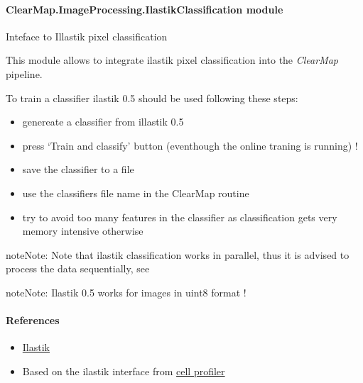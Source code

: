 \documentclass[letterpaper,10pt,english]{sphinxmanual}
\begin{document}
\paragraph{ClearMap.ImageProcessing.IlastikClassification module}
\label{api/ClearMap.ImageProcessing:module-ClearMap.ImageProcessing.IlastikClassification}\label{api/ClearMap.ImageProcessing:clearmap-imageprocessing-ilastikclassification-module}
Inteface to Illastik pixel classification

This module allows to integrate ilastik pixel classification into the \emph{ClearMap}
pipeline.

To train a classifier ilastik 0.5 should be used following these steps:
\begin{itemize}
\item {} 
genereate a classifier from illastik 0.5

\item {} 
press `Train and classify' button (eventhough the online traning is running) !

\item {} 
save the classifier to a file

\item {} 
use the classifiers file name in the ClearMap routine {\hyperref[api/ClearMap.ImageProcessing:ClearMap.ImageProcessing.IlastikClassification.classifyPixel]{\emph{}}}

\item {} 
try to avoid too many features in the classifier
as classification gets very memory intensive otherwise

\end{itemize}

\begin{notice}{note}{Note:}
Note that ilastik classification works in parallel, thus it is advised to
process the data sequentially, see
\end{notice}

\begin{notice}{note}{Note:}
Ilastik 0.5 works for images in uint8 format !
\end{notice}
\paragraph{References}
\begin{itemize}
\item {} 
\href{http://ilastik.org/}{Ilastik}

\item {} 
Based on the ilastik interface from \href{http://www.cellprofiler.org/}{cell profiler}

\end{itemize}
\end{document}
